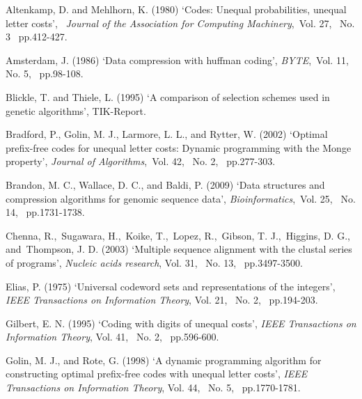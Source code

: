 \documentclass{singlecol-new}
\theoremstyle{TH}{
\newtheorem{lemma}{Lemma}
\newtheorem{theorem}[lemma]{Theorem}
\newtheorem{corrolary}[lemma]{Corrolary}
\newtheorem{conjecture}[lemma]{Conjecture}
\newtheorem{proposition}[lemma]{Proposition}
\newtheorem{claim}[lemma]{Claim}
\newtheorem{stheorem}[lemma]{Wrong Theorem}
}
\theoremstyle{THrm}{
\newtheorem{definition}{Definition}
\newtheorem{question}{Question}
\newtheorem{remark}{Remark}
\newtheorem{scheme}{Scheme}
}
\theoremstyle{THhit}{
\newtheorem{case}{Case}[section]
}
\begin{document}



\begin{thebibliography}{99}

Altenkamp, D. and Mehlhorn, K. (1980) `Codes:
Unequal probabilities, unequal letter costs',~ {\it  Journal of the Association for Computing
Machinery},~Vol. 27,~ No. 3~ pp.412-427.

Amsterdam, J. (1986) `Data compression with huffman
coding', {\it  BYTE},~Vol. 11,~ No. 5,~ pp.98-108.

Blickle, T. and  Thiele, L. (1995) `A comparison of selection schemes used in genetic algorithms', TIK-Report.

Bradford, P., Golin, M. J., Larmore, L. L., and
Rytter, W. (2002) `Optimal prefix-free codes for
unequal letter costs: Dynamic programming
with the Monge property', {\it  Journal of Algorithms},~Vol. 42,~ No. 2,~ pp.277-303.

Brandon, M. C., Wallace, D. C., and  Baldi, P. (2009) `Data structures and compression algorithms
for genomic sequence data', {\it  Bioinformatics},~Vol. 25,~ No. 14,~ pp.1731-1738.

Chenna, R.,~Sugawara,  H.,~Koike, T.,~Lopez, R.,~Gibson, T. J.,~Higgins, D. G., and~Thompson, J. D. (2003) `Multiple sequence alignment with the
clustal series of programs', {\it Nucleic acids research}, Vol. 31,~ No. 13,~ pp.3497-3500.

Elias, P. (1975) `Universal codeword sets and representations of the integers', {\it IEEE Transactions on Information Theory}, Vol. 21,~ No. 2,~ pp.194-203.

Gilbert, E. N. (1995) `Coding with digits of unequal
costs', {\it IEEE Transactions on Information
Theory}, Vol. 41,~ No. 2,~ pp.596-600.

Golin, M. J., and Rote, G. (1998) `A dynamic programming algorithm for constructing optimal prefix-free codes with unequal letter costs', {\it IEEE Transactions on Information Theory}, Vol. 44,~ No. 5,~ pp.1770-1781.


\end{thebibliography}
\end{document}

